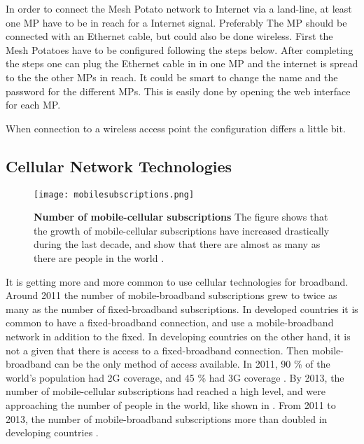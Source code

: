 



In order to connect the Mesh Potato network to Internet via a land-line, at least one MP have to be in reach for a Internet signal. Preferably The MP should be connected with an Ethernet cable, but could also be done wireless.  First the Mesh Potatoes have to be configured following the steps below. After completing the steps one can plug the Ethernet cable in in one MP and the internet is spread to the the other MPs in reach. It could be smart to change the name and the password for the different MPs. This is easily done by opening the web interface for each MP. 

When connection to a wireless access point the configuration differs a little bit.

\subsection{Cellular Network Technologies}

\begin{figure}[b]
  \centering
      \texttt{[image: mobilesubscriptions.png]}
  \caption [Number of mobile-cellular subscriptions]{\textbf{Number of mobile-cellular subscriptions} The figure shows that the growth of mobile-cellular subscriptions have increased drastically during the last decade, and show that there are almost as many as there are people in the world \cite{itu2013}.}
  \label{fig:subscribers}
\end{figure}

It is getting more and more common to use cellular technologies for broadband. Around 2011 the number of mobile-broadband subscriptions grew to twice as many as the number of fixed-broadband subscriptions. In developed countries it is common to have a fixed-broadband connection, and use a mobile-broadband network in addition to the fixed. In developing countries on the other hand, it is not a given that there is access to a fixed-broadband connection. Then mobile-broadband can be the only method of access available. In 2011, 90 \% of the world's population had 2G coverage, and 45 \% had 3G coverage \cite{itu2011}. By 2013, the number of mobile-cellular subscriptions had reached a high level, and were approaching the number of people in the world, like shown in . From 2011 to 2013, the number of mobile-broadband  subscriptions more than doubled in developing countries \cite{itu2013}. 

